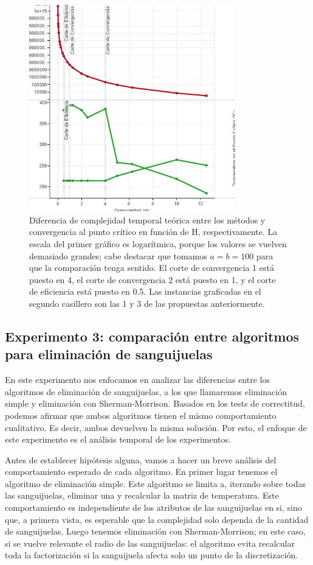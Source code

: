\begin{figure}[h]
    \centering
    \includegraphics[width=0.8\textwidth]{Eficiencia de LU vs Gaussiana}
    \caption{Diferencia de complejidad temporal teórica entre los métodos y convergencia al punto crítico en función de H, respectivamente. La escala del primer gráfico es logarítmica, porque los valores se vuelven demasiado grandes; cabe destacar que tomamos $a = b = 100$ para que la comparación tenga sentido. El corte de convergencia 1 está puesto en 4, el corte de convergencia 2 está puesto en 1, y el corte de eficiencia está puesto en 0.5. Las instancias graficadas en el segundo casillero son las 1 y 3 de las propuestas anteriormente.}
    \label{fig:exp21-cmp}
\end{figure}

\subsection{Experimento 3: comparación entre algoritmos para eliminación de sanguijuelas}

En este experimento nos enfocamos en analizar las diferencias entre los algoritmos de eliminación de sanguijuelas, a los que llamaremos eliminación simple y eliminación con Sherman-Morrison. Basados en los tests de correctitud, podemos afirmar que ambos algoritmos tienen el mismo comportamiento cualitativo. Es decir, ambos devuelven la misma solución. Por esto, el enfoque de este experimento es el análisis temporal de los experimentos. 

Antes de establecer hipótesis alguna, vamos a hacer un breve análisis del comportamiento esperado de cada algoritmo. En primer lugar tenemos el algoritmo de eliminación simple. Este algoritmo se limita a, iterando sobre todas las sanguijuelas, eliminar una y recalcular la matriz de temperatura. Este comportamiento es independiente de los atributos de las sanguijuelas en si, sino que, a primera vista, es esperable que la complejidad solo dependa de la cantidad de sanguijuelas. Luego tenemos eliminación con Sherman-Morrison; en este caso, si se vuelve relevante el radio de las sanguijuelas: el algoritmo evita recalcular toda la factorización si la sanguijuela afecta solo un punto de la discretización.

